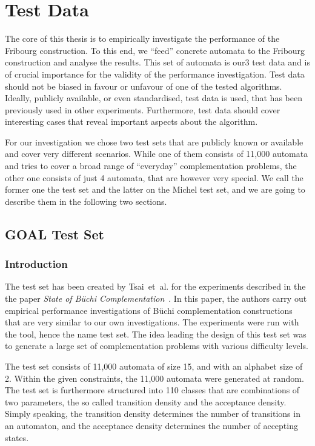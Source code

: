 \section{Test Data}
The core of this thesis is to empirically investigate the performance of the Fribourg construction. To this end, we ``feed'' concrete automata to the Fribourg construction and analyse the results. This set of automata is our3 test data and is of crucial importance for the validity of the performance investigation. Test data should not be biased in favour or unfavour of one of the tested algorithms. Ideally, publicly available, or even standardised, test data is used, that has been previously used in other experiments. Furthermore, test data should cover interesting cases that reveal important aspects about the algorithm.

For our investigation we chose two test sets that are publicly known or available and cover very different scenarios. While one of them consists of 11,000 automata and tries to cover a broad range of ``everyday'' complementation problems, the other one consists of just 4 automata, that are however very special. We call the former one the \goal{} test set and the latter on the Michel test set, and we are going to describe them in the following two sections.


\subsection{GOAL Test Set}
\label{4_goal_testset}

\subsubsection{Introduction}
The \goal{} test set has been created by Tsai~et~al. for the experiments described in the the paper \textit{State of Büchi Complementation}~\cite{2010_tsai}. In this paper, the authors carry out empirical performance investigations of Büchi complementation constructions that are very similar to our own investigations. The experiments were run with the \goal{} tool, hence the name \goal{} test set. The idea leading the design of this test set was to generate a large set of complementation problems with various difficulty levels.

The test set consists of 11,000 automata of size 15, and with an alphabet size of 2. Within the given constraints, the 11,000 automata were generated at random. The test set is furthermore structured into 110 classes that are combinations of two parameters, the so called transition density and the acceptance density. Simply speaking, the transition density determines the number of transitions in an automaton, and the acceptance density determines the number of accepting states.

